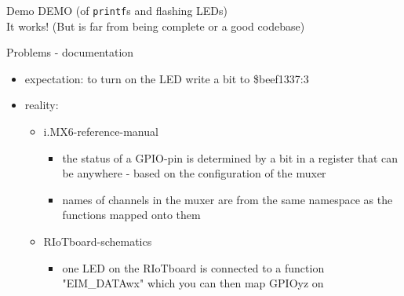 \documentclass[9pt]{beamer}
\begin{document}
\begin{frame}{Demo}
DEMO (of \texttt{printf}s and flashing LEDs)
\\
It works! (But is far from being complete or a good codebase)
\end{frame}

\begin{frame}{Problems - documentation}
\pause
 \begin{itemize}
 \item expectation: to turn on the LED write a bit to \$beef1337:3
\pause
 \item reality:
 	\begin{itemize}
 \item i.MX6-reference-manual
 		\begin{itemize}
 \item the status of a GPIO-pin is determined by a bit in a register that can be anywhere - based on the configuration of the muxer
 \item names of channels in the muxer are from the same namespace as the functions mapped onto them
 		\end{itemize}
 \item RIoTboard-schematics
 		\begin{itemize}
 \item one LED on the RIoTboard is connected to a function "EIM\_DATAwx" \textcolor{light-gray}{which you can then map GPIOyz on}
 		\end{itemize}
 	\end{itemize}
 \end{itemize}
\end{frame}
\end{document}
